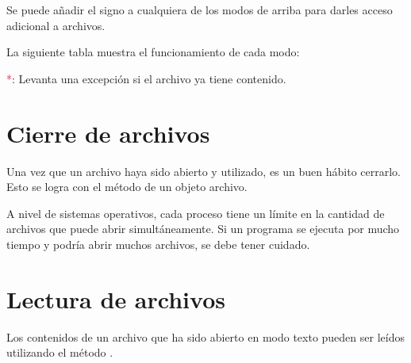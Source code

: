 Se puede añadir el signo \ttt{\qq + \qq} a cualquiera de los modos de arriba para darles acceso adicional a archivos.\medskip

La siguiente tabla muestra el funcionamiento de cada modo:
\medskip\medskip


\medskip\medskip

\textcolor{Crimson}{*}: Levanta una excepción  si el archivo ya tiene contenido.

\section{Cierre de archivos}

Una vez que un archivo haya sido abierto y utilizado, es un buen hábito cerrarlo.
Esto se logra con el método  de un objeto archivo.


A nivel de sistemas operativos, cada proceso tiene un límite en la cantidad de archivos que puede abrir simultáneamente.
Si un programa se ejecuta por mucho tiempo y podría abrir muchos archivos, se debe tener cuidado.

\section{Lectura de archivos}

Los contenidos de un archivo que ha sido abierto en modo texto pueden ser leídos utilizando el método .

